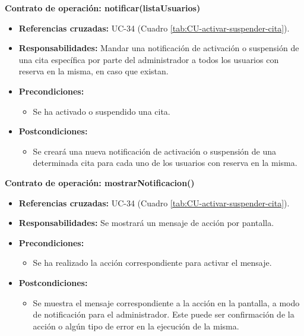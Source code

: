 \textbf{Contrato de operación: notificar(listaUsuarios)}
\begin{itemize}
\item \textbf{Referencias cruzadas:} UC-34 (Cuadro \ref{tab:CU-activar-suspender-cita}).
\item \textbf{Responsabilidades:} Mandar una notificación de activación o suspensión de una cita específica por parte del administrador a todos los usuarios con reserva en la misma, en caso que existan.
\item \textbf{Precondiciones:} 
 \begin{itemize}
\item Se ha activado o suspendido una cita.
\end {itemize}
\item \textbf{Postcondiciones:} 
 \begin{itemize}
\item Se creará una nueva notificación de activación o suspensión de una determinada cita para cada uno de los usuarios con reserva en la misma.
\end {itemize}
\end {itemize}

\textbf{Contrato de operación: mostrarNotificacion()}
\begin{itemize}
\item \textbf{Referencias cruzadas:} UC-34 (Cuadro \ref{tab:CU-activar-suspender-cita}).
\item \textbf{Responsabilidades:} Se mostrará un mensaje de acción por pantalla.
\item \textbf{Precondiciones:} 
 \begin{itemize}
\item Se ha realizado la acción correspondiente para activar el mensaje.
\end {itemize}
\item \textbf{Postcondiciones:} 
 \begin{itemize}
\item Se muestra el mensaje correspondiente a la acción en la pantalla, a modo de notificación para el administrador. Este puede ser confirmación de la acción o algún tipo de error en la ejecución de la misma.
\end {itemize}
\end {itemize}


\vspace{10mm}

